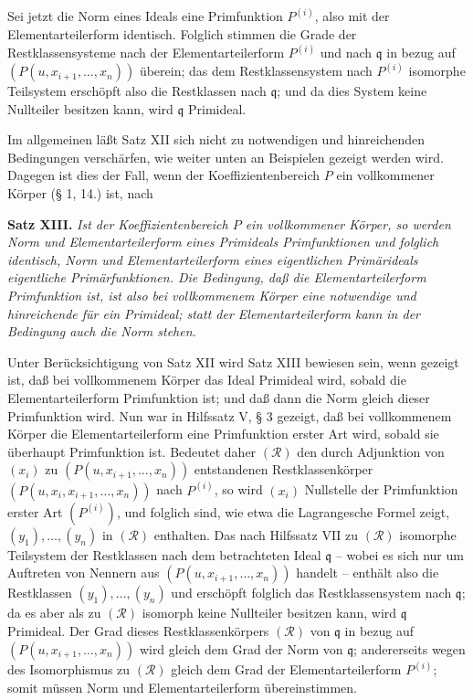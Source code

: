 \documentclass[11pt]{article}
\providecommand{\frakq}{\mathfrak q}
\begin{document}
Sei jetzt die Norm eines Ideals eine Primfunktion $P^{(i)}$, also mit der Elementarteilerform identisch. Folglich stimmen die Grade der Restklassensysteme nach der Elementarteilerform $P^{(i)}$ und nach $\frakq$ in bezug auf $(P(u,x_{i+1},\ldots,x_n))$ überein; das dem Restklassensystem nach $P^{(i)}$ isomorphe Teilsystem erschöpft also die Restklassen nach $\frakq$; und da dies System keine Nullteiler besitzen kann, wird $\frakq$ Primideal.

Im allgemeinen läßt Satz XII sich nicht zu notwendigen und hinreichenden Bedingungen verschärfen, wie weiter unten an Beispielen gezeigt werden wird. Dagegen ist dies der Fall, wenn der Koeffizientenbereich $P$ ein vollkommener Körper (§ 1, 14.) ist, nach

\textbf{Satz XIII.} \emph{Ist der Koeffizientenbereich $P$ ein vollkommener Körper, so werden Norm und Elementarteilerform eines Primideals Primfunktionen und folglich identisch, Norm und Elementarteilerform eines eigentlichen Primärideals eigentliche Primärfunktionen. Die Bedingung, daß die Elementarteilerform Primfunktion ist, ist also bei vollkommenem Körper eine notwendige und hinreichende für ein Primideal; statt der Elementarteilerform kann in der Bedingung auch die Norm stehen.}

Unter Berücksichtigung von Satz XII wird Satz XIII bewiesen sein, wenn gezeigt ist, daß bei vollkommenem Körper das Ideal Primideal wird, sobald die Elementarteilerform Primfunktion ist; und daß dann die Norm gleich dieser Primfunktion wird. Nun war in Hilfssatz V, § 3 gezeigt, daß bei vollkommenem Körper die Elementarteilerform eine Primfunktion erster Art wird, sobald sie überhaupt Primfunktion ist. Bedeutet daher $(\mathcal R)$ den durch Adjunktion von $(x_i)$ zu $(P(u,x_{i+1},\ldots,x_n))$ entstandenen Restklassenkörper $(P(u,x_i,x_{i+1},\ldots,x_n))$ nach $P^{(i)}$, so wird $(x_i)$ Nullstelle der Primfunktion erster Art $(P^{(i)})$, und folglich sind, wie etwa die Lagrangesche Formel zeigt, $(y_1),\ldots,(y_n)$ in $(\mathcal R)$ enthalten. Das nach Hilfssatz VII zu $(\mathcal R)$ isomorphe Teilsystem der Restklassen nach dem betrachteten Ideal $\frakq$ -- wobei es sich nur um Auftreten von Nennern aus $(P(u,x_{i+1},\ldots,x_n))$ handelt -- enthält also die Restklassen $(y_1),\ldots,(y_n)$ und erschöpft folglich das Restklassensystem nach $\frakq$; da es aber als zu $(\mathcal R)$ isomorph keine Nullteiler besitzen kann, wird $\frakq$ Primideal. Der Grad dieses Restklassenkörpers $(\mathcal R)$ von $\frakq$ in bezug auf $(P(u,x_{i+1},\ldots,x_n))$ wird gleich dem Grad der Norm von $\frakq$; andererseits wegen des Isomorphismus zu $(\mathcal R)$ gleich dem Grad der Elementarteilerform $P^{(i)}$; somit müssen Norm und Elementarteilerform übereinstimmen.
\end{document}
